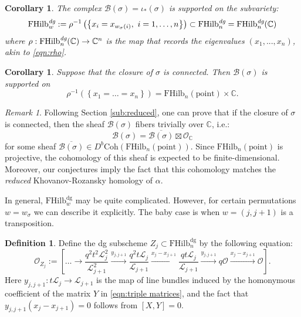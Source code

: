 \documentclass[12pt]{amsart}
\numberwithin{equation}{section}
\newtheorem{corollary}[theorem]{Corollary}
\theoremstyle{definition}
\newtheorem{definition}[theorem]{Definition}
\theoremstyle{remark}
\newtheorem{remark}[theorem]{Remark}
\newcommand{\CC}{\mathbb{C}}
\newcommand{\CB}{\mathcal{B}}
\newcommand{\CL}{\mathcal{L}}
\newcommand{\CO}{\mathcal{O}}
\newcommand{\CT}{\mathcal{T}}
\renewcommand{\1}{\mathbf{1}}
\newcommand{\coh}{\mathrm{Coh}}
\newcommand{\FH}{\mathrm{FHilb}}
\newcommand{\point}{\mathrm{point}}
\newcommand{\dg}{\text{dg}}%
\newcommand{\edg}{\emph{dg}}
\begin{document}
\begin{corollary}
\label{cor:support sheaves}
The complex $\CB(\sigma) = \iota_*(\sigma)$ is supported on the subvariety:
$$
\FH^\edg_w := \rho^{-1} \left(\left\{x_i=x_{w_{\sigma}(i)},\ i=1,\ldots,n\right\} \right)\subset \FH_n^\edg = \FH_n^\edg(\CC)
$$
where $\rho:\FH_n^\edg(\CC) \rightarrow \CC^n$ is the map that records the eigenvalues $(x_1,...,x_n)$, akin to \eqref{eqn:rho}. 
\end{corollary}

\begin{corollary}
Suppose that the closure of $\sigma$ is connected. Then $\CB(\sigma)$ is supported on 
$$
\rho^{-1} \left( \left\{x_1=\ldots=x_n \right\} \right)=\FH_n(\point)\times \CC.
$$
\end{corollary}

\begin{remark}
Following Section \ref{sub:reduced}, one can prove that if the closure of $\sigma$ is connected, then the sheaf $\CB(\sigma)$ fibers trivially over $\CC$, i.e.:
$$
\CB(\sigma) = \overline{\CB(\sigma)}\boxtimes \CO_{\CC}
$$
for some sheaf $\overline{\CB(\sigma)}\in D^b\coh(\FH_n(\point))$. Since $\FH_n(\point)$ is projective, the cohomology of this sheaf is expected to be finite-dimensional. Moreover, our conjectures imply the fact that this cohomology matches the {\em reduced} Khovanov-Rozansky homology of $\alpha$.
\end{remark}

In general, $\FH_w^\dg$ may be quite complicated. However,
for certain permutations $w=w_\sigma$ we can describe it explicitly. The baby case is when $w = (j,j+1)$ is a transposition.

\begin{definition}
Define the dg subscheme $Z_j \subset \FH_n^{\dg}$ by the following equation:
\begin{equation}
\label{eqn:z periodic}
\CO_{Z_j} := \left[\ldots \longrightarrow \frac {q^2t^2\CL_j^2}{\CL_{j+1}^{2}} \xrightarrow{y_{j,j+1}} \frac {q^2t\CL_j}{\CL_{j+1}} \xrightarrow{x_j-x_{j+1}} \frac {qt\CL_j}{\CL_{j+1}} \xrightarrow{y_{j,j+1}}  q\CO \xrightarrow{x_j-x_{j+1}} \CO \right]. 
\end{equation}
Here $y_{j,j+1}:t\CL_j\to \CL_{j+1}$ is the map of line bundles induced by the homonymous coefficient of the matrix $Y$ in \eqref{eqn:triple matrices}, and the fact that $y_{j,j+1}(x_j-x_{j+1})=0$ follows from $[X,Y]=0$.

\end{definition}
\end{document}
